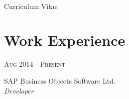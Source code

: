\documentclass[10pt]{article} %
\begin{document}
\color{text1} %


\par{\\ %
{Curriculum {Vitae}\\[15pt]\par} %
	

\begin{minipage}[t]{0.5\textwidth} %
\vspace{0pt} %
	

\section{Work Experience} 


{\raggedleft\textsc{Aug 2014 - Present}\par}

{\raggedright\large SAP Business Objects Software Ltd.\\
\textit{Developer}\\[5pt]}


\end{minipage}}
\end{document}
